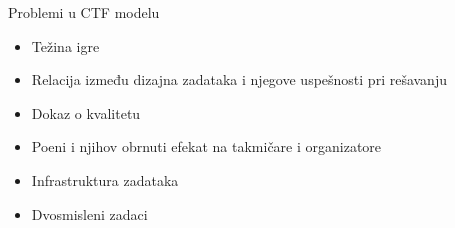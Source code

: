 \documentclass{beamer}
\begin{document}
\begin{frame}[fragile]
\begin{columns}[T]
\begin{column}{.46\textwidth}

        \end{column}

        \begin{column}{.46\textwidth}


            \begin{block}{Problemi u CTF modelu}
                \begin{itemize}
                    \item Težina igre
                    \item Relacija između dizajna zadataka i njegove
                        uspešnosti pri rešavanju
                    \item Dokaz o kvalitetu
                    \item Poeni i njihov obrnuti efekat na takmičare i
                        organizatore
                    \item Infrastruktura zadataka
                    \item Dvosmisleni zadaci
                \end{itemize}
            \end{block}



\end{column}
\end{columns}
\end{frame}
\end{document}

